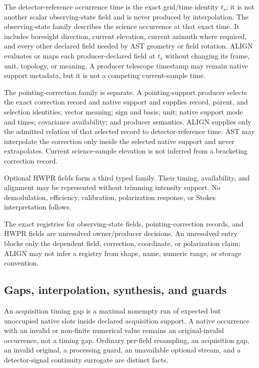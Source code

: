 The detector-reference occurrence time is the exact grid/time identity
\(t_s\); it is not another scalar observing-state field and is never produced
by interpolation.  The observing-state family describes the science
occurrence at that exact time.  It includes boresight direction, current
elevation, current azimuth where required, and every other declared field
needed by AST geometry or field rotation.  ALIGN evaluates or maps each
producer-declared field at \(t_s\) without changing its frame, unit, topology,
or meaning.  A producer telescope timestamp may remain native support
metadata, but it is not a competing current-sample time.

The pointing-correction family is separate.  A pointing-support producer
selects the exact correction record and native support and supplies record,
parent, and selection identities; vector meaning; sign and basis; unit; native
support mode and times; covariance availability; and producer semantics.
ALIGN supplies only the admitted relation of that selected record to
detector-reference time.  AST may interpolate the correction only inside the
selected native support and never extrapolates.  Current science-sample
elevation is not inferred from a bracketing correction record.

Optional HWPR fields form a third typed family.  Their timing, availability,
and alignment may be represented without trimming intensity support.  No
demodulation, efficiency, calibration, polarization response, or Stokes
interpretation follows.

The exact registries for observing-state fields, pointing-correction records,
and HWPR fields are unresolved owner/producer decisions.  An unresolved entry
blocks only the dependent field, correction, coordinate, or polarization
claim; ALIGN may not infer a registry from shape, name, numeric range, or
storage convention.

\subsection{Gaps, interpolation, synthesis, and guards}

An acquisition timing gap is a maximal nonempty run of expected but unoccupied
native slots inside declared acquisition support.  A native occurrence with
an invalid or non-finite numerical value remains an original-invalid
occurrence, not a timing gap.  Ordinary per-field resampling, an acquisition
gap, an invalid original, a processing guard, an unavailable optional stream,
and a detector-signal continuity surrogate are distinct facts.

